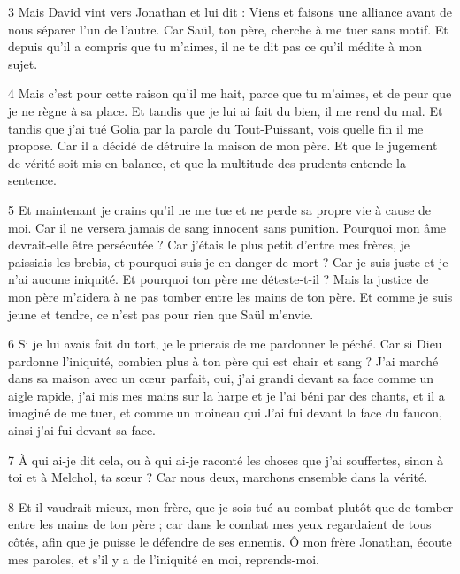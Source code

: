 \par 3 Mais David vint vers Jonathan et lui dit : Viens et faisons une alliance avant de nous séparer l'un de l'autre. Car Saül, ton père, cherche à me tuer sans motif. Et depuis qu'il a compris que tu m'aimes, il ne te dit pas ce qu'il médite à mon sujet.

\par 4 Mais c'est pour cette raison qu'il me hait, parce que tu m'aimes, et de peur que je ne règne à sa place. Et tandis que je lui ai fait du bien, il me rend du mal. Et tandis que j'ai tué Golia par la parole du Tout-Puissant, vois quelle fin il me propose. Car il a décidé de détruire la maison de mon père. Et que le jugement de vérité soit mis en balance, et que la multitude des prudents entende la sentence.

\par 5 Et maintenant je crains qu'il ne me tue et ne perde sa propre vie à cause de moi. Car il ne versera jamais de sang innocent sans punition. Pourquoi mon âme devrait-elle être persécutée ? Car j'étais le plus petit d'entre mes frères, je paissiais les brebis, et pourquoi suis-je en danger de mort ? Car je suis juste et je n'ai aucune iniquité. Et pourquoi ton père me déteste-t-il ? Mais la justice de mon père m'aidera à ne pas tomber entre les mains de ton père. Et comme je suis jeune et tendre, ce n’est pas pour rien que Saül m’envie.

\par 6 Si je lui avais fait du tort, je le prierais de me pardonner le péché. Car si Dieu pardonne l'iniquité, combien plus à ton père qui est chair et sang ? J'ai marché dans sa maison avec un cœur parfait, oui, j'ai grandi devant sa face comme un aigle rapide, j'ai mis mes mains sur la harpe et je l'ai béni par des chants, et il a imaginé de me tuer, et comme un moineau qui J'ai fui devant la face du faucon, ainsi j'ai fui devant sa face.

\par 7 À qui ai-je dit cela, ou à qui ai-je raconté les choses que j'ai souffertes, sinon à toi et à Melchol, ta sœur ? Car nous deux, marchons ensemble dans la vérité.

\par 8 Et il vaudrait mieux, mon frère, que je sois tué au combat plutôt que de tomber entre les mains de ton père ; car dans le combat mes yeux regardaient de tous côtés, afin que je puisse le défendre de ses ennemis. Ô mon frère Jonathan, écoute mes paroles, et s'il y a de l'iniquité en moi, reprends-moi.

